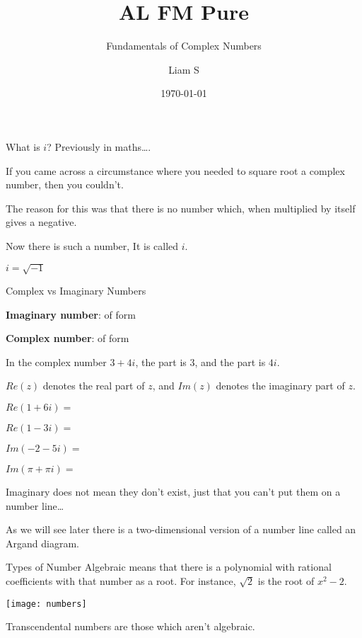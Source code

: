 \documentclass{beamer}
\title[Pure]{{\color{aa}\Huge\adfbullet{9}}AL FM Pure}
\subtitle{Fundamentals of Complex Numbers}
\author{Liam S}
\date{\today}
\begin{document}
	
	\setlength{\abovedisplayskip}{0pt}
	\setlength{\belowdisplayskip}{0pt}
	\setlength{\abovedisplayshortskip}{0pt}
	\setlength{\belowdisplayshortskip}{0pt}
	
	\frame{\titlepage}
	
	\begin{frame}[shrink=15]{What is $i$?}
	    Previously in maths….
    
        If you came across a circumstance where you needed to square root a complex number, then you couldn’t.
        
        The reason for this was that there is no number which, when multiplied by itself gives a negative.
        
        Now there is such a number, It is called $i$.
        
        \begin{definition}
            $i=\sqrt{-1}$
        \end{definition}
	\end{frame}
	
	\begin{frame}[shrink=15]{Complex vs Imaginary Numbers}
	    
	    \textbf{Imaginary number}: of form 
	    
	    \textbf{Complex number}: of form 
	    
	    In the complex number $3+4i$, the  part is $3$, and the  part is $4i$.
	    
	    \newline
	    
	    \begin{definition}
	        $Re(z)$ denotes the real part of $z$, and $Im(z)$ denotes the imaginary part of $z$.
	    \end{definition}

	    $Re(1+6i)=$ 

	    $Re(1-3i)=$ 

	    $Im(-2-5i)=$ 

	    $Im(\pi + \pi i)=$ \sol{$\pi$}
	    
	    Imaginary does not mean they don’t exist, just that you can’t put them on a number line…

        As we will see later there is a two-dimensional version of a number line called an Argand diagram.
	\end{frame}
	
	\begin{frame}[shrink=15]{Types of Number}
	    \alert<1>{Algebraic means that there is a polynomial with rational coefficients with that number as a root. For instance, $\sqrt{2}$ is the root of $x^2-2$.}

	    \texttt{[image: numbers]}
	    
	    \alert<1>{Transcendental numbers are those which aren’t algebraic.}
	\end{frame}
	
\end{document}
